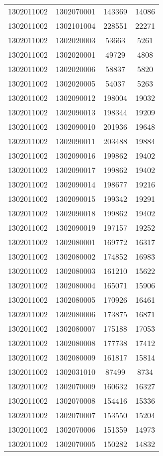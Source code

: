 \begin{longtable}[h]{llcc}
		1302011002 & 1302070001 & 143369 & 14086\\
		1302011002 & 1302101004 & 228551 & 22271\\
		1302011002 & 1302020003 & 53663 & 5261\\
		1302011002 & 1302020001 & 49729 & 4808\\
		1302011002 & 1302020006 & 58837 & 5820\\
		1302011002 & 1302020005 & 54037 & 5263\\
		1302011002 & 1302090012 & 198004 & 19032\\
		1302011002 & 1302090013 & 198344 & 19209\\
		1302011002 & 1302090010 & 201936 & 19648\\
		1302011002 & 1302090011 & 203488 & 19884\\
		1302011002 & 1302090016 & 199862 & 19402\\
		1302011002 & 1302090017 & 199862 & 19402\\
		1302011002 & 1302090014 & 198677 & 19216\\
		1302011002 & 1302090015 & 199342 & 19291\\
		1302011002 & 1302090018 & 199862 & 19402\\
		1302011002 & 1302090019 & 197157 & 19252\\
		1302011002 & 1302080001 & 169772 & 16317\\
		1302011002 & 1302080002 & 174852 & 16983\\
		1302011002 & 1302080003 & 161210 & 15622\\
		1302011002 & 1302080004 & 165071 & 15906\\
		1302011002 & 1302080005 & 170926 & 16461\\
		1302011002 & 1302080006 & 173875 & 16871\\
		1302011002 & 1302080007 & 175188 & 17053\\
		1302011002 & 1302080008 & 177738 & 17412\\
		1302011002 & 1302080009 & 161817 & 15814\\
		1302011002 & 1302031010 & 87499 & 8734\\
		1302011002 & 1302070009 & 160632 & 16327\\
		1302011002 & 1302070008 & 154416 & 15336\\
		1302011002 & 1302070007 & 153550 & 15204\\
		1302011002 & 1302070006 & 151359 & 14973\\
		1302011002 & 1302070005 & 150282 & 14832\\

\end{longtable}
